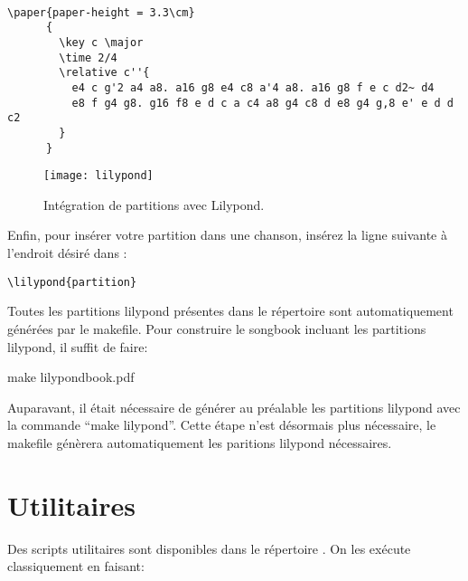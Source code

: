 \documentclass[versionenligne]{patacrep}
\begin{document}
\begin{verbatim}

\paper{paper-height = 3.3\cm}
      {
        \key c \major
        \time 2/4
        \relative c''{
          e4 c g'2 a4 a8. a16 g8 e4 c8 a'4 a8. a16 g8 f e c d2~ d4
          e8 f g4 g8. g16 f8 e d c a c4 a8 g4 c8 d e8 g4 g,8 e' e d d c2
        }
      }
\end{verbatim}

\begin{figure}
  \centering
  \texttt{[image: lilypond]}
  \caption{Intégration de partitions avec Lilypond.}
  \label{fig:lilypond}
\end{figure}

Enfin, pour insérer votre partition dans une chanson, insérez la ligne
suivante à l'endroit désiré dans :

\begin{verbatim}
\lilypond{partition}
\end{verbatim}

Toutes les partitions lilypond présentes dans le répertoire
 sont automatiquement générées par le
makefile. Pour construire le songbook incluant les partitions
lilypond, il suffit de faire:

\begin{unixcom}
  make lilypondbook.pdf 
\end{unixcom}

\begin{nota}
  Auparavant, il était nécessaire de générer au préalable les
  partitions lilypond avec la commande ``make lilypond''. Cette étape
  n'est désormais plus nécessaire, le makefile génèrera
  automatiquement les paritions lilypond nécessaires.
\end{nota}

\section{Utilitaires}
\label{sec:utilitaires}

Des scripts utilitaires sont disponibles dans le répertoire
. On les exécute classiquement en faisant:

\end{document}
